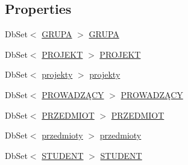 \subsection*{Properties}
\begin{DoxyCompactItemize}
\item 
Db\+Set$<$ \hyperlink{class_dziennik_ocen_1_1_g_r_u_p_a}{G\+R\+U\+PA} $>$ \hyperlink{class_dziennik_ocen_1_1_dziennik_ocen_entities_ad4334a280ce27588b4e549d1f9bdf370}{G\+R\+U\+PA}
\item 
Db\+Set$<$ \hyperlink{class_dziennik_ocen_1_1_p_r_o_j_e_k_t}{P\+R\+O\+J\+E\+KT} $>$ \hyperlink{class_dziennik_ocen_1_1_dziennik_ocen_entities_a4a2aa21f8f38da7c5964e8d0f104e93b}{P\+R\+O\+J\+E\+KT}
\item 
Db\+Set$<$ \hyperlink{class_dziennik_ocen_1_1projekty}{projekty} $>$ \hyperlink{class_dziennik_ocen_1_1_dziennik_ocen_entities_aa5fb13b67d92101e714b25d03353a313}{projekty}
\item 
Db\+Set$<$ \hyperlink{class_dziennik_ocen_1_1_p_r_o_w_a_d_z_xC4_x84_c_y}{P\+R\+O\+W\+A\+D\+ZĄ\+CY} $>$ \hyperlink{class_dziennik_ocen_1_1_dziennik_ocen_entities_a395e57706a24fe9f929e53dc41e73ea0}{P\+R\+O\+W\+A\+D\+ZĄ\+CY}
\item 
Db\+Set$<$ \hyperlink{class_dziennik_ocen_1_1_p_r_z_e_d_m_i_o_t}{P\+R\+Z\+E\+D\+M\+I\+OT} $>$ \hyperlink{class_dziennik_ocen_1_1_dziennik_ocen_entities_a7e15ce866104268720701617a3f1ff7c}{P\+R\+Z\+E\+D\+M\+I\+OT}
\item 
Db\+Set$<$ \hyperlink{class_dziennik_ocen_1_1przedmioty}{przedmioty} $>$ \hyperlink{class_dziennik_ocen_1_1_dziennik_ocen_entities_ae76bc2bdeec6f76972792082e1656298}{przedmioty}
\item 
Db\+Set$<$ \hyperlink{class_dziennik_ocen_1_1_s_t_u_d_e_n_t}{S\+T\+U\+D\+E\+NT} $>$ \hyperlink{class_dziennik_ocen_1_1_dziennik_ocen_entities_a6551b0ae65432cd0d3db51f56fbeb36f}{S\+T\+U\+D\+E\+NT}
\end{DoxyCompactItemize}


